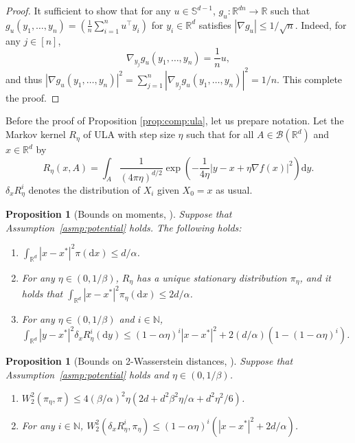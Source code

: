\documentclass[12pt,reqno]{amsart}
\newtheorem{proposition}[theorem]{Proposition}
\theoremstyle{remark}
\theoremstyle{definition}
\newcommand{\bbS}{\mathbb{S}}
\newcommand{\calB}{\mathcal{B}}
\newcommand{\N}{\mathbb{N}}
\newcommand{\R}{\mathbb{R}}
\newcommand{\diff}{\mathrm{d}}
\begin{document}
\begin{proof}
    It sufficient to show that for any $u\in\bbS^{d-1}$, $g_{u}:\R^{dn}\to\R$ such that $g_{u}(y_{1},\ldots,y_{n})=(\frac{1}{n}\sum_{i=1}^{n}u^{\top}y_{i})$ for $y_{i}\in\R^{d}$ satisfies $|\nabla g_{u}|\le 1/\sqrt{n}$.
    Indeed, for any $j\in[n]$,\begin{equation*}
        \nabla_{y_{j}}g_{u}(y_{1},\ldots,y_{n})=\frac{1}{n}u,
    \end{equation*}
    and thus $|\nabla g_{u}(y_{1},\ldots,y_{n})|^{2}=\sum_{j=1}^{n}|\nabla_{y_{j}}g_{u}(y_{1},\ldots,y_{n})|^{2}=1/n$.
    This complete the proof.
\end{proof}


Before the proof of Proposition \ref{prop:comp:ula}, let us prepare notation.
Let the Markov kernel $R_{\eta}$ of ULA with step size $\eta$ such that for all $A\in\calB(\R^{d})$ and $x\in\R^{d}$ by 
\begin{equation}\label{eq:def:kernel}
    R_{\eta}(x,A)=\int_{A}\frac{1}{(4\pi\eta)^{d/2}}\exp\left(-\frac{1}{4\eta}\left|y-x+\eta\nabla f(x)\right|^{2}\right)\diff y.
\end{equation}
$\delta_{x}R_{\eta}^{i}$ denotes the distribution of $X_{i}$ given $X_{0}=x$ as usual.

\begin{proposition}[Bounds on moments, \citealp{durmus2019high}]\label{prop:moment}
    Suppose that Assumption~\ref{asmp:potential} holds. 
    The following holds:
    \begin{enumerate}
        \item[(a)] $\int_{\R^{d}}|x-x^{\ast}|^{2}\pi(\diff x)\le d/\alpha$.
        \item[(b)] For any $\eta \in (0, 1/\beta)$, $R_{\eta}$ has a unique stationary distribution $\pi_{\eta}$, and it holds that $\int_{\R^{d}}|x - x^{\ast}|^{2} \pi_{\eta}(\diff x) \le 2d/\alpha$.
        \item[(c)] For any $\eta \in (0, 1/\beta)$ and $i\in\N$, $\int_{\R^{d}}|y - x^{\ast}|^{2} \delta_{x}R_{\eta}^{i}(\diff y) \le (1-\alpha\eta)^{i}|x-x^{\ast}|^{2}+2(d/\alpha)(1-(1-\alpha\eta)^{i})$.
    \end{enumerate}
    
\end{proposition}

\begin{proposition}[Bounds on 2-Wasserstein distances, \citealp{durmus2019high}]\label{prop:wasserstein}
    Suppose that Assumption~\ref{asmp:potential} holds and $\eta\in(0,1/\beta)$.
    \begin{enumerate}
        \item[(a)] $W_{2}^{2}(\pi_{\eta},\pi)\le 4(\beta/\alpha)^{2}\eta(2d + d^{2}\beta^{2}\eta/\alpha + d^{2}\eta^{2}/6)$.
        \item[(b)] For any $i\in\N$, $W_{2}^{2}(\delta_{x}R_{\eta}^{i},\pi_{\eta})\le (1-\alpha\eta)^{i}(|x-x^{\ast}|^{2}+2d/\alpha)$.
    \end{enumerate}
\end{proposition}
\end{document}
